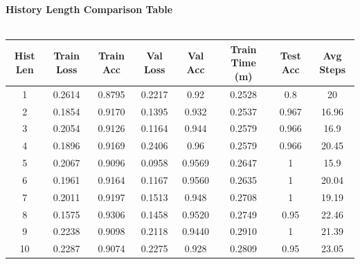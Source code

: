 \documentclass[a4paper]{article}
\begin{document}
\clearpage
\textbf{History Length Comparison Table}\\
\\
\begin{tabular}{|c|c|c|c|c|c|c|c|}
\hline 
Hist Len & Train Loss & Train Acc & Val Loss & Val Acc & Train Time (m) & Test Acc & Avg Steps \\ 
\hline 
1 & 0.2614 & 0.8795 & 0.2217 & 0.92 & 0.2528 & 0.8 & 20 \\ 
\hline 
2 & 0.1854 & 0.9170 & 0.1395 & 0.932 & 0.2537 & 0.967 & 16.96 \\ 
\hline 
3 & 0.2054 & 0.9126 & 0.1164 & 0.944 & 0.2579 & 0.966 & 16.9 \\ 
\hline 
4 & 0.1896 & 0.9169 & 0.2406 & 0.96 & 0.2579 & 0.966 & 20.45 \\ 
\hline 
5 & 0.2067 & 0.9096 & 0.0958 & 0.9569 & 0.2647 & 1 & 15.9 \\ 
\hline 
6 & 0.1961 & 0.9164 & 0.1167 & 0.9560 & 0.2635 & 1 & 20.04 \\ 
\hline 
7 & 0.2011 & 0.9197 & 0.1513 & 0.948 & 0.2708 & 1 & 19.19 \\ 
\hline 
8 & 0.1575 & 0.9306 & 0.1458 & 0.9520 & 0.2749 & 0.95 & 22.46 \\ 
\hline 
9 & 0.2238 & 0.9098 & 0.2118 & 0.9440 & 0.2910 & 1 & 21.39 \\ 
\hline 
10 & 0.2287 & 0.9074 & 0.2275 & 0.928 & 0.2809 & 0.95 & 23.05 \\ 
\hline
\end{tabular} 
\end{document}
